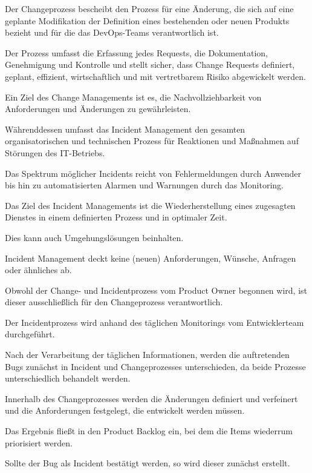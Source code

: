 Der Changeprozess bescheibt den Prozess für eine Änderung, die sich auf eine geplante Modifikation der Definition eines bestehenden oder neuen Produkts bezieht und für die das DevOps-Teams verantwortlich ist. 

Der Prozess umfasst die Erfassung jedes Requests, die Dokumentation, Genehmigung und Kontrolle und stellt sicher, dass Change Requests definiert, geplant, effizient, wirtschaftlich und mit vertretbarem Risiko abgewickelt werden. 

Ein Ziel des Change Managements ist es, die Nachvollziehbarkeit von Anforderungen und Änderungen zu gewährleisten.

Währenddessen umfasst das Incident Management den gesamten organisatorischen und technischen Prozess für Reaktionen und Maßnahmen auf Störungen des IT-Betriebs.

Das Spektrum möglicher Incidents reicht von Fehlermeldungen durch Anwender bis hin zu automatisierten Alarmen und Warnungen durch das Monitoring.

Das Ziel des Incident Managements ist die Wiederherstellung eines zugesagten Dienstes in einem definierten Prozess und in optimaler Zeit. 

Dies kann auch Umgehungslösungen beinhalten. 

Incident Management deckt keine (neuen) Anforderungen, Wünsche, Anfragen oder ähnliches ab.  

Obwohl der Change- und Incidentprozess vom Product Owner begonnen wird, ist dieser ausschließlich für den Changeprozess verantwortlich. 

Der Incidentprozess wird anhand des täglichen Monitorings vom Entwicklerteam durchgeführt. 

Nach der Verarbeitung der täglichen Informationen, werden die auftretenden Bugs zunächst in Incident und Changeprozesses unterschieden, da beide Prozesse unterschiedlich behandelt werden.

Innerhalb des Changeprozesses werden die Änderungen definiert und verfeinert und die Anforderungen festgelegt, die entwickelt werden müssen. 

Das Ergebnis fließt in den Product Backlog ein, bei dem die Items wiederrum priorisiert werden. 

Sollte der Bug als Incident bestätigt werden, so wird dieser zunächst erstellt. 

